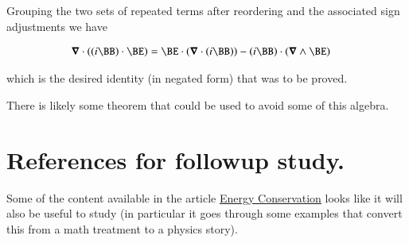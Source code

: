 \documentclass{article}
\begin{document}
Grouping the two sets of repeated terms after reordering and the associated sign adjustments we have

\begin{align}\label{eqn:poyntingDivergence}
\spacegrad \cdot ((i \BB) \cdot \BE) &= \BE \cdot (\spacegrad \cdot (i \BB)) - (i \BB) \cdot (\spacegrad \wedge \BE)
\end{align}

which is the desired identity (in negated form) that was to be proved.

There is likely some theorem that could be used to avoid some of this algebra.

\section{ References for followup study. }

Some of the content available in the 
article \href{http://farside.ph.utexas.edu/teaching/em/lectures/node89.html}{Energy Conservation} looks like it will also be useful to study (in particular
it goes through some examples that convert this from a math treatment to
a physics story).



\end{document}
